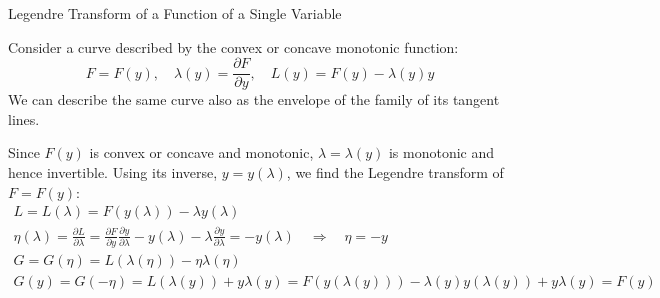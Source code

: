 \begin{thm}
    Legendre Transform of a Function of a Single Variable

Consider a curve described by the convex or concave monotonic function:
\[
F = F(y), \quad \lambda(y) = \frac{\partial F}{\partial y}, \quad L(y) = F(y) - \lambda(y)y
\]
We can describe the same curve also as the envelope of the family of its tangent lines.

Since \(F(y)\) is convex or concave and monotonic, 
\(\lambda = \lambda(y)\) is monotonic and hence invertible. 
Using its inverse, \(y = y(\lambda)\), we find the Legendre transform of \(F = F(y)\):
\begin{gather*}
    L = L(\lambda) = F(y(\lambda)) - \lambda y(\lambda)
    \\
    \eta(\lambda) = \frac{\partial L}{\partial \lambda} 
    = \frac{\partial F}{\partial y} \frac{\partial y}{\partial \lambda} 
    - y(\lambda) - \lambda \frac{\partial y}{\partial \lambda} 
    = -y(\lambda)\quad \Rightarrow\quad \eta = -y
    \\
    G = G(\eta) = L(\lambda(\eta)) - \eta \lambda(\eta)
    \\
    G(y) = G(-\eta) = L(\lambda(y)) + y \lambda(y) 
    = F(y(\lambda(y))) - \lambda(y) y(\lambda(y)) + y \lambda(y) = F(y)
\end{gather*}
\end{thm}

% 

